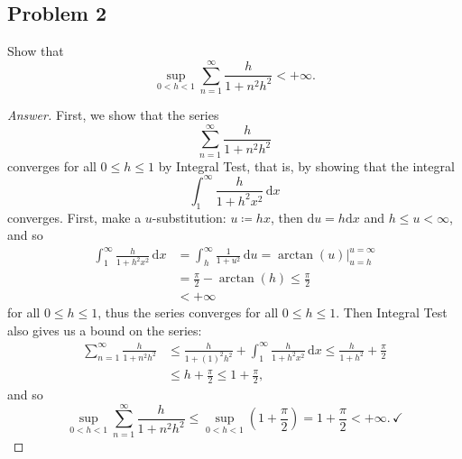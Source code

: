 \documentclass[12pt]{article}
\newcommand\paren[1]{\left( #1 \right)}
\renewcommand{\i}[4]{\int_{#1}^{#2} {#3} \, \mathrm{d} {#4} }
\newcommand{\rd}{\mathrm{d}}
\theoremstyle{definition}
\begin{document}
\subsection{Problem 2 \texorpdfstring{\cite{Rudin}}{}}
Show that 
\[
    \sup\limits_{0 < h < 1} \sum\limits_{n = 1}^{\infty} \frac{h}{1 + n^2h^2} < +\infty . 
\]
\begin{proof}[Answer]
    First, we show that the series 
    \[
        \sum\limits_{n = 1}^{\infty} \frac{h}{1 + n^2h^2}
    \]
    converges for all $0 \leq h \leq 1$ by Integral Test, that is, by showing that the integral 
    \[
        \i{1}{\infty}{ \frac{h}{1 + h^2 x^2} }{x}
    \]
    converges. First, make a $u$-substitution: $u \coloneqq h x$, then $\rd u = h \rd x$ and $h \leq u < \infty$, and so 
    \begin{align*}
        \i{1}{\infty}{ \frac{h}{1 + h^2 x^2} }{x} & = \i{h}{\infty}{ \frac{1}{1 + u^2} }{u} = \left. \arctan(u) \right|_{u = h}^{u = \infty} \\ 
        & = \frac{\pi}{2} - \arctan(h) \leq \frac{\pi}{2} \\ 
        & < +\infty
    \end{align*}
    for all $0 \leq h \leq 1$, thus the series converges for all $0 \leq h \leq 1$. Then Integral Test also gives us a bound on the series: 
    \begin{align*}
        \sum\limits_{n = 1}^{\infty} \frac{h}{1 + n^2h^2} & \leq \frac{h}{1 + (1)^2h^2} + \i{1}{\infty}{ \frac{h}{1 + h^2 x^2} }{x} \leq \frac{h}{1 + h^2} + \frac{\pi}{2} \\ 
        & \leq h + \frac{\pi}{2} \leq 1 + \frac{\pi}{2} , 
    \end{align*}
    and so 
    \[
        \sup\limits_{0 < h < 1} \sum\limits_{n = 1}^{\infty} \frac{h}{1 + n^2h^2} \leq \sup\limits_{0 < h < 1} \paren{ 1 + \frac{\pi}{2} } = 1 + \frac{\pi}{2} < +\infty . \, \checkmark 
    \]
\end{proof}
\end{document}
